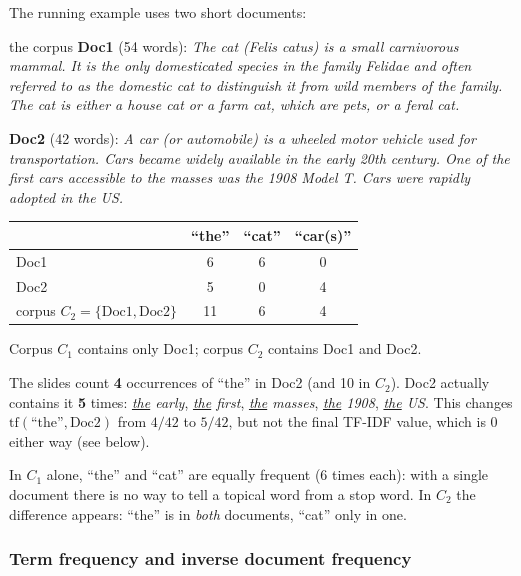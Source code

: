 The running example uses two short documents:

\begin{nbexample}{the corpus}
\textbf{Doc1} (54 words): \emph{The cat (Felis catus) is a small carnivorous mammal. It
is the only domesticated species in the family Felidae and often referred to as the
domestic cat to distinguish it from wild members of the family. The cat is either a
house cat or a farm cat, which are pets, or a feral cat.}

\textbf{Doc2} (42 words): \emph{A car (or automobile) is a wheeled motor vehicle used for
transportation. Cars became widely available in the early 20th century. One of the first
cars accessible to the masses was the 1908 Model T. Cars were rapidly adopted in the US.}

\begin{center}
\small
\begin{tabular}{@{}l c c c@{}}
\toprule
 & \textbf{``the''} & \textbf{``cat''} & \textbf{``car(s)''} \\
\midrule
Doc1 & 6 & 6 & 0 \\
Doc2 & 5 & 0 & 4 \\
\midrule
corpus $C_2 = \{\text{Doc1}, \text{Doc2}\}$ & 11 & 6 & 4 \\
\bottomrule
\end{tabular}
\end{center}
Corpus $C_1$ contains only Doc1; corpus $C_2$ contains Doc1 and Doc2.
\end{nbexample}

\begin{nbwarning}
The slides count \textbf{4} occurrences of ``the'' in Doc2 (and 10 in $C_2$). Doc2
actually contains it \textbf{5} times: \emph{\underline{the} early}, \emph{\underline{the}
first}, \emph{\underline{the} masses}, \emph{\underline{the} 1908}, \emph{\underline{the}
US}. This changes $\text{tf}(\text{``the''}, \text{Doc2})$ from $4/42$ to $5/42$, but not
the final TF-IDF value, which is $0$ either way (see below).
\end{nbwarning}

In $C_1$ alone, ``the'' and ``cat'' are equally frequent (6 times each): with a single
document there is no way to tell a topical word from a stop word. In $C_2$ the
difference appears: ``the'' is in \emph{both} documents, ``cat'' only in one.

\subsubsection{Term frequency and inverse document frequency}

